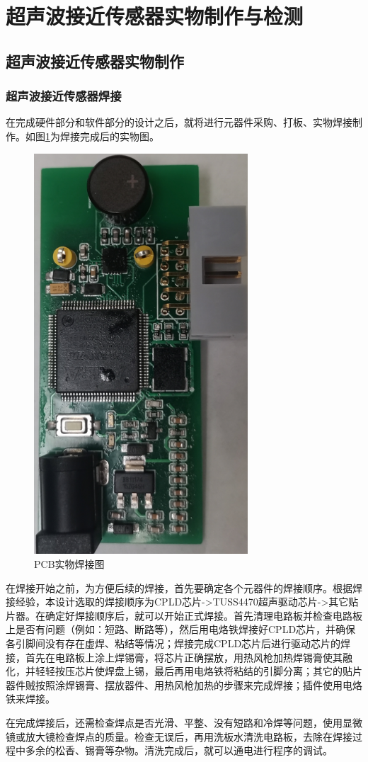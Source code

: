     \newpage
	\section{超声波接近传感器实物制作与检测}
 \subsection{超声波接近传感器实物制作}
 \subsubsection{超声波接近传感器焊接}
	在完成硬件部分和软件部分的设计之后，就将进行元器件采购、打板、实物焊接制作。如图\ref{PCB实物焊接图}为焊接完成后的实物图。
	\begin{figure}[!h]
	    \centering
	    \includegraphics[width=8cm,angle=-90]{figure/physical map.png}
	    \caption{PCB实物焊接图}
	    \label{PCB实物焊接图}
	\end{figure}\par
 在焊接开始之前，为方便后续的焊接，首先要确定各个元器件的焊接顺序。根据焊接经验，本设计选取的焊接顺序为CPLD芯片->TUSS4470超声驱动芯片->其它贴片器。在确定好焊接顺序后，就可以开始正式焊接。首先清理电路板并检查电路板上是否有问题（例如：短路、断路等），然后用电烙铁焊接好CPLD芯片，并确保各引脚间没有存在虚焊、粘结等情况；焊接完成CPLD芯片后进行驱动芯片的焊接，首先在电路板上涂上焊锡膏，将芯片正确摆放，用热风枪加热焊锡膏使其融化，并轻轻按压芯片使焊盘上锡，最后再用电烙铁将粘结的引脚分离；其它的贴片器件贼按照涂焊锡膏、摆放器件、用热风枪加热的步骤来完成焊接；插件使用电烙铁来焊接。\par
 在完成焊接后，还需检查焊点是否光滑、平整、没有短路和冷焊等问题，使用显微镜或放大镜检查焊点的质量。检查无误后，再用洗板水清洗电路板，去除在焊接过程中多余的松香、锡膏等杂物。清洗完成后，就可以通电进行程序的调试。


